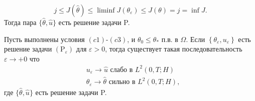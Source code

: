 \[
    j \leq J(\widehat{\theta})
    \leq \liminf J \left(\theta_{\varepsilon}\right)
    \leq J(\theta)=j=\inf J.
\]
Тогда пара $\{\widehat{\theta}, \widehat{u}\}$ есть решение задачи P\@.

\begin{theorem}
    \label{th:3_2:3}
    Пусть выполнены условия $(c1)$-$(c3)$, и $\theta_{0} \leq \theta_{*}$ п.в. в $\Omega$.
    Если $\left\{\theta_{\varepsilon}, u_{\varepsilon}\right\}$ есть решение задачи
    $\left(\mathrm{P}_{\varepsilon}\right)$ для $\varepsilon>0$, тогда существует
    такая последовательность $\varepsilon \rightarrow+0$ что
    \[
        \begin{aligned}
            &u_{\varepsilon} \rightarrow \widehat{u} \text { слабо в } L^{2}(0, T ; H) \\
            &\theta_{\varepsilon} \rightarrow \widehat{\theta} \text { сильно в } L^{2}(0, T ; H),
        \end{aligned}
    \]
    где $\{\widehat{\theta}, \widehat{u}\}$ есть решение задачи P\@.
\end{theorem}
